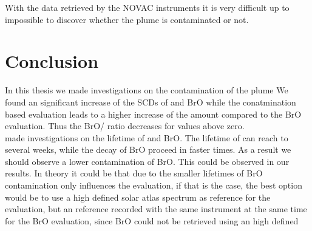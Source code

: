 \documentclass  [
  paper    = a4,
  BCOR     = 10mm,
  twoside,
  fontsize = 12pt,
  fleqn,
  toc      = bibnumbered,
  toc      = listofnumbered,
  numbers  = noendperiod,
  headings = normal,
  listof   = leveldown,
  version  = 3.03
]                                       {scrreprt}
\begin{document}
	  With the data retrieved by the NOVAC instruments it is very difficult up to impossible to discover whether the plume is contaminated or not. 




	\chapter{Conclusion}
	In this thesis we made investigations on the contamination of the plume 
	We found an significant increase of the SCDs of  and BrO while the conatmination based evaluation leads to a higher increase of the  amount compared to the BrO evaluation. Thus the BrO/ ratio decreases for values above zero.\\
	\cite{geeignete quelle, irgendwo hab ich das schon gehoert} made investigations on the lifetime of  and BrO. The lifetime of  can reach to several weeks, while the decay of BrO proceed in faster times. As a result we should observe a lower contamination of BrO. This could be observed in our results. In theory it could be that due to the smaller lifetimes of BrO contamination only influences the  evaluation, if that is the case, the best option would be to use a high defined solar atlas spectrum as reference for the  evaluation, but an reference recorded with the same instrument at the same time for the BrO evaluation, since BrO could not be retrieved using an high defined 

	
	
	
\end{document}
